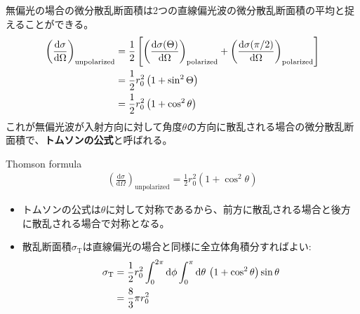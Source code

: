 \documentclass[a4paper,papersize,uplatex,dvipdfmx,10pt]{jsarticle}
\begin{document}
\begin{screen}
  無偏光の場合の微分散乱断面積は2つの直線偏光波の微分散乱断面積の平均と捉えることができる。
  \begin{align}
    \left( \frac{\mathrm{d}\sigma}{\mathrm{d}\Omega} \right)_{\mathrm{unpolarized}} &=
    \frac{1}{2}\left[ \left( \frac{\mathrm{d}\sigma(\Theta)}{\mathrm{d}\Omega} \right)_{\mathrm{polarized}} + \left( \frac{\mathrm{d}\sigma(\pi / 2)}{\mathrm{d}\Omega} \right)_{\mathrm{polarized}} \right]\notag\\
    &= \frac{1}{2}r_{0}^{2}\left( 1+\sin^{2}\Theta \right)\notag\\
    &= \frac{1}{2}r_{0}^{2}\left( 1+\cos^{2}\theta \right)
  \end{align}
  これが無偏光波が入射方向に対して角度$\theta$の方向に散乱される場合の微分散乱断面積で、\textbf{トムソンの公式}と呼ばれる。
  \begin{itembox}[l]{Thomson formula}
    \begin{align*}
      \left( \frac{\mathrm{d}\sigma}{\mathrm{d}\Omega} \right)_{\mathrm{unpolarized}} = \frac{1}{2}r_{0}^{2}\left( 1+\cos^{2}\theta \right)
    \end{align*}
  \end{itembox}
  \begin{itemize}
    \item トムソンの公式は$\theta$に対して対称であるから、前方に散乱される場合と後方に散乱される場合で対称となる。
    \item 散乱断面積$\sigma_{\mathrm{T}}$は直線偏光の場合と同様に全立体角積分すればよい:
    \begin{align}
      \sigma_{\mathrm{T}} &= \frac{1}{2}r_{0}^{2} \int^{2\pi}_{0}\mathrm{d}\phi \int^{\pi}_{0}\mathrm{d}\theta\, \left( 1+\cos^{2}\theta \right) \sin\theta\notag\\
      &= \frac{8}{3}\pi r_{0}^{2}\label{eq:sanran_unpol}
    \end{align}
  \end{itemize}
\end{screen}
\end{document}
